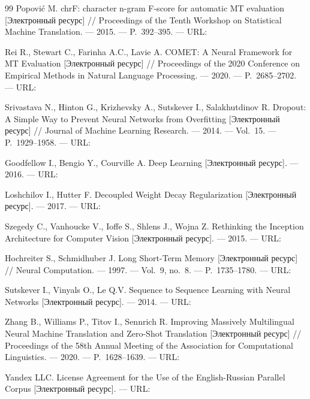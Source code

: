 \begin{thebibliography}{99}
	Popović M.
	chrF: character n-gram F-score for automatic MT evaluation [Электронный ресурс] // Proceedings of the Tenth Workshop on Statistical Machine Translation. — 2015. — P.~392--395. — URL:~

	Rei R., Stewart C., Farinha A.C., Lavie A.
	COMET: A Neural Framework for MT Evaluation [Электронный ресурс] // Proceedings of the 2020 Conference on Empirical Methods in Natural Language Processing. — 2020. — P.~2685--2702. — URL:~

	Srivastava N., Hinton G., Krizhevsky A., Sutskever I., Salakhutdinov R.
	Dropout: A Simple Way to Prevent Neural Networks from Overfitting [Электронный ресурс] // Journal of Machine Learning Research. — 2014. — Vol.~15. — P.~1929--1958. — URL:~

	Goodfellow I., Bengio Y., Courville A.
	Deep Learning [Электронный ресурс]. — 2016. — URL:~

	Loshchilov I., Hutter F.
	Decoupled Weight Decay Regularization [Электронный ресурс]. — 2017. — URL:~

	Szegedy C., Vanhoucke V., Ioffe S., Shlens J., Wojna Z.
	Rethinking the Inception Architecture for Computer Vision [Электронный ресурс]. — 2015. — URL:~

	Hochreiter S., Schmidhuber J.
	Long Short-Term Memory [Электронный ресурс] // Neural Computation. — 1997. — Vol.~9, no.~8. — P.~1735--1780. — URL:~

	Sutskever I., Vinyals O., Le Q.V.
	Sequence to Sequence Learning with Neural Networks [Электронный ресурс]. — 2014. — URL:~

	Zhang B., Williams P., Titov I., Sennrich R.
	Improving Massively Multilingual Neural Machine Translation and Zero-Shot Translation [Электронный ресурс] // Proceedings of the 58th Annual Meeting of the Association for Computational Linguistics. — 2020. — P.~1628--1639. — URL:~

	Yandex LLC.
	License Agreement for the Use of the English-Russian Parallel Corpus [Электронный ресурс]. — URL:~


\end{thebibliography}
